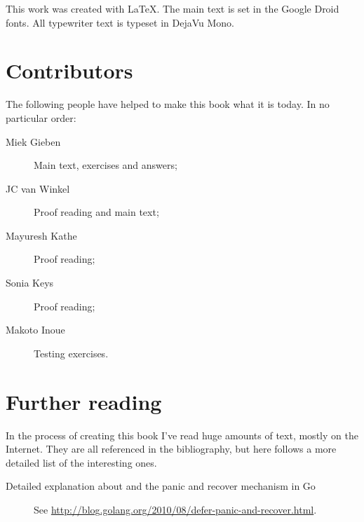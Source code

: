 \noindent{}This work was created with \LaTeX. The main text is set in
the Google Droid fonts. All typewriter text is typeset in DejaVu Mono.

\section{Contributors}
The following people have helped to make this book what it is today.
In no particular order:
\begin{description}
\item[Miek Gieben] 
{Main text, exercises and answers;}
\item[JC van Winkel]
{Proof reading and main text;}
\item[Mayuresh Kathe]
{Proof reading;}
\item[Sonia Keys]
{Proof reading;}
\item[Makoto Inoue]
{Testing exercises.}
\end{description}

\section{Further reading}
In the process of creating this book I've read huge amounts of text,
mostly on the Internet. They are all referenced in the bibliography, but
here follows a more detailed list of the interesting ones.
\begin{description}
\item[Detailed explanation about  and the panic and recover
mechanism in Go]{See 
\url{http://blog.golang.org/2010/08/defer-panic-and-recover.html}.}
\end{description}
